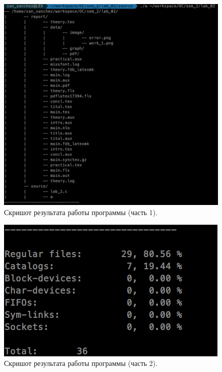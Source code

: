 \begin{figure}[H]
    \centering
    \includegraphics[scale=0.5]{data/image/work_2.png}
    \caption{Скришот результата работы программы (часть 1).}
\end{figure}
\begin{figure}[H]
    \centering
    \includegraphics[scale=0.6]{data/image/work_3.png}
    \caption{Скришот результата работы программы (часть 2).}
\end{figure}



